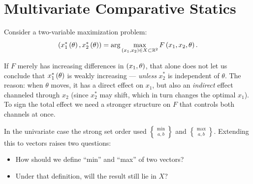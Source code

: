 

\section{Multivariate Comparative Statics}\label{multivariate-comparative-statics}

Consider a two-variable maximization problem:
\[\left(x_1^*\left(\theta\right),x_2^*\left(\theta\right)\right) = \arg\max_{\left(x_1,x_2\right)\in X\subset \mathbb R^2}F\left(x_1,x_2,\theta\right).\]

If \(F\) merely has increasing differences in \(\left(x_1,\theta\right)\),
that alone does not let us conclude that \(x_1^*\left(\theta\right)\) is
weakly increasing — \emph{unless} \(x_2^*\) is independent of
\(\theta\). The reason: when \(\theta\) moves, it has a direct effect
on \(x_1\), but also an \emph{indirect} effect channeled through
\(x_2\) (since \(x_2^*\) may shift, which in turn changes the optimal
\(x_1\)). To sign the total effect we need a stronger structure on
\(F\) that controls both channels at once.

In the univariate case the strong set order used \(\min\brace{a,b}\)
and \(\max\brace{a,b}\). Extending this to vectors raises two
questions:

\begin{itemize}
\item
  How should we define ``min'' and ``max'' of two vectors?
\item
  Under that definition, will the result still lie in \(X\)?
\end{itemize}

